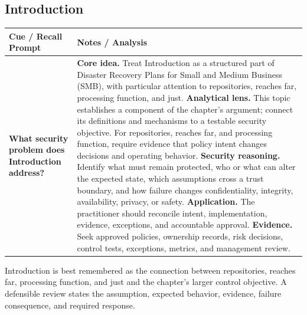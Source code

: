 \documentclass[11pt]{article}
\newcommand{\CornellHeader}{%
\rowcolor{Navy}\color{white}\bfseries Cue / Recall Prompt & \color{white}\bfseries Notes / Analysis\\\hline}
\newcommand{\CornellRow}[2]{%
\cellcolor{CueGray}\RaggedRight\textbf{#1} & \RaggedRight #2\\\hline}
\begin{document}
\subsection*{Introduction}
\begin{longtable}{>{\RaggedRight\arraybackslash}p{}|>{\RaggedRight\arraybackslash}p{}}
\CornellHeader
\CornellRow{What security problem does Introduction address?}{\textbf{Core idea.} Treat Introduction as a structured part of Disaster Recovery Plans for Small and Medium Business (SMB), with particular attention to repositories, reaches far, processing function, and just. \textbf{Analytical lens.} This topic establishes a component of the chapter's argument; connect its definitions and mechanisms to a testable security objective. For repositories, reaches far, and processing function, require evidence that policy intent changes decisions and operating behavior. \textbf{Security reasoning.} Identify what must remain protected, who or what can alter the expected state, which assumptions cross a trust boundary, and how failure changes confidentiality, integrity, availability, privacy, or safety. \textbf{Application.} The practitioner should reconcile intent, implementation, evidence, exceptions, and accountable approval. \textbf{Evidence.} Seek approved policies, ownership records, risk decisions, control tests, exceptions, metrics, and management review.}
\end{longtable}
\begin{topicsummary}
Introduction is best remembered as the connection between repositories, reaches far, processing function, and just and the chapter's larger control objective. A defensible review states the assumption, expected behavior, evidence, failure consequence, and required response.
\end{topicsummary}
\end{document}
